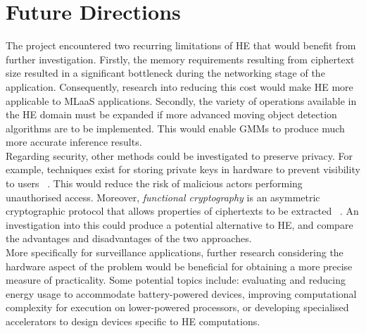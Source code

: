 \section{Future Directions}
\indent \indent
The project encountered two recurring limitations of HE that would benefit from further investigation. Firstly, the memory requirements resulting from ciphertext size resulted in a significant bottleneck during the networking stage of the application. Consequently, research into reducing this cost would make HE more applicable to MLaaS applications. Secondly, the variety of operations available in the HE domain must be expanded if more advanced moving object detection algorithms are to be implemented. This would enable GMMs to produce much more accurate inference results.
\smallskip \\ \indent
Regarding security, other methods could be investigated to preserve privacy. For example, techniques exist for storing private keys in hardware to prevent visibility to users ~\cite{Lorch}. This would reduce the risk of malicious actors performing unauthorised access. Moreover, \textit{functional cryptography} is an asymmetric cryptographic protocol that allows properties of ciphertexts to be extracted ~\cite{Boneh}. An investigation into this could produce a potential alternative to HE, and compare the advantages and disadvantages of the two approaches.
\smallskip \\ \indent
More specifically for surveillance applications, further research considering the hardware aspect of the problem would be beneficial for obtaining a more precise measure of practicality. Some potential topics include: evaluating and reducing energy usage to accommodate battery-powered devices, improving computational complexity for execution on lower-powered processors, or developing specialised accelerators to design devices specific to HE computations. 
